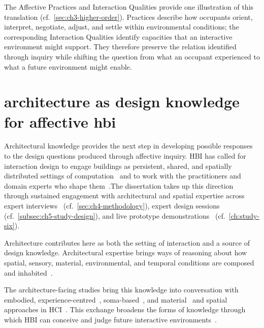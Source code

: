 The Affective Practices and Interaction Qualities provide one
illustration of this translation
(cf.~\autoref{sec:ch3-higher-order}). Practices describe how occupants
orient, interpret, negotiate, adjust, and settle within environmental
conditions; the corresponding Interaction Qualities identify
capacities that an interactive environment might support. They
therefore preserve the relation identified through inquiry while
shifting the question from what an occupant experienced to what a
future environment might enable.


\section{architecture as design knowledge for affective hbi}
\label{sec:architecture-design-knowledge}

Architectural knowledge provides the next step in developing possible
responses to the design questions produced through affective inquiry. HBI has called for interaction design to engage buildings as persistent, shared, and spatially distributed settings of computation~\cite{alavi2018artifacts,alavi2019introduction,wiberg2020interaction} and to work with the practitioners and domain experts who shape them~\cite{alavi2019introduction,kirsh2019architects,rao2025smart}.The dissertation takes up this direction through sustained engagement with architectural and spatial expertise across expert interviews~\cite{rao2025designing} (cf.~\autoref{sec:ch4-methodology}), expert design sessions~\cite{rao2026biophilic} (cf.~\autoref{subsec:ch5-study-design}), and live prototype demonstrations~\cite{rao2027biophilic} (cf.~\autoref{ch:study-six}).

Architecture contributes here as both the setting of interaction and a source of design knowledge. Architectural expertise brings ways of reasoning about how spatial, sensory, material, environmental, and temporal conditions are composed and inhabited~\cite{pallasmaa2024eyes,griffero2016atmospheres,zumthor2006atmospheres,verma2022appraisal}. 

The architecture-facing studies bring this knowledge into conversation with embodied, experience-centred~\cite{hook2018designing}, soma-based~\cite{tschaepe2021somaesthetics}, and material~\cite{van2018skin} and spatial approaches in HCI~\cite{nabil2017interioractive}. This exchange broadens the forms of knowledge through which HBI can conceive and judge future interactive environments~\cite{rao2025designing,rao2026biophilic}.

